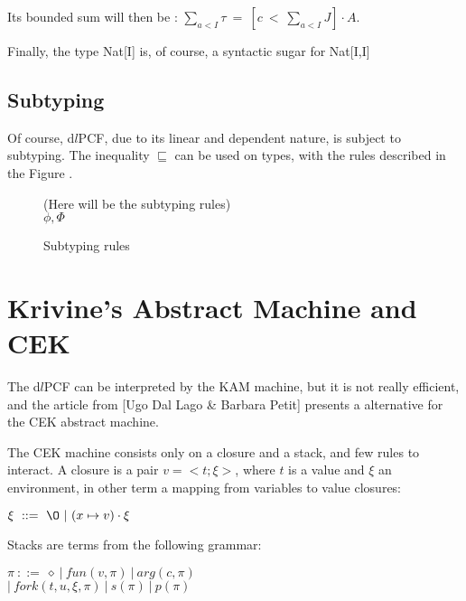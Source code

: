 \documentclass[a4paper,12pt]{report}
\begin{document}
Its bounded sum will then be : $\sum_{a<I} \tau ~=~ [c~<~\sum_{a<I}J] \cdot A$. 

Finally, the type Nat[I] is, of course, a syntactic sugar for Nat[I,I]

\subsection{Subtyping}

Of course, d$l$PCF, due to its linear and dependent nature, is subject to
subtyping. The inequality $\sqsubseteq$ can be used on types, with the rules
described in the Figure \label{subtyping}.

\begin{figure}
  (Here will be the subtyping rules) \\
  $\phi , \Phi$
  \caption{Subtyping rules}
  \label{subtyping}
\end{figure}

\section{Krivine's Abstract Machine and CEK}

The d$l$PCF can be interpreted by the KAM machine, but it is not really
efficient, and the article from [Ugo Dal Lago \& Barbara Petit] presents a
alternative for the CEK abstract machine.

The CEK machine consists only on a closure and a stack, and few rules to
interact. A closure is a pair $v =<t;\xi>$, where $t$ is a value and $\xi$
an environment, in other term a mapping from variables to value closures:

\begin{center}
  $\xi ~ ::=~\O~|~(x \mapsto v) \cdot \xi$
\end{center}

Stacks are terms from the following grammar:

\begin{center}
  $\pi~::=~\diamond~|~fun(v, \pi)~|~arg(c, \pi)$ \\
  $|~fork(t,u,\xi,\pi)~|~s(\pi)~|~p(\pi)$
\end{center}
\end{document}
